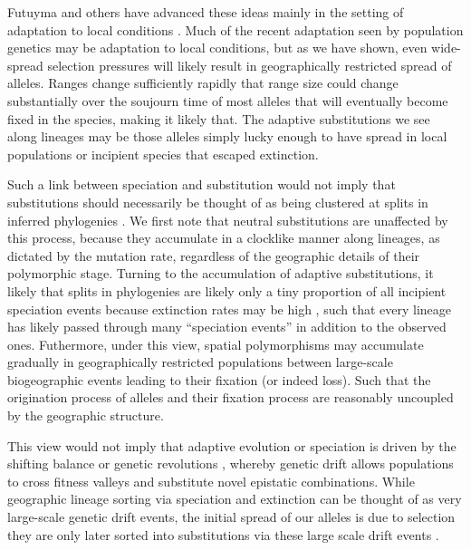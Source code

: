 \documentclass{article}
\begin{document}
Futuyma and others have advanced these ideas mainly in the
setting of adaptation to local conditions 
\citep[particularly local communities ][]{} . 
Much of the recent adaptation seen by
population genetics may be adaptation to local conditions, 
but as we have shown, even wide-spread selection pressures will likely result in 
geographically restricted spread of alleles.
Ranges change sufficiently rapidly that
range size could change substantially over the soujourn time of most alleles 
that will eventually become fixed in the species, making it likely that. 
The adaptive substitutions we see along lineages may be those alleles 
simply lucky enough to have spread in local populations or incipient species that escaped extinction.

Such a link between speciation and substitution would not imply that
substitutions should necessarily be thought of as being clustered at splits in inferred phylogenies 
\citep[see ][for a recent exhange on this]{Pennell:14,Venditti:14,Pennell:14B}. 
We first note that neutral substitutions are unaffected by this process, 
because they accumulate in a clocklike manner along lineages, 
as dictated by the mutation rate, 
regardless of the geographic details of their polymorphic stage. 
Turning to the accumulation of adaptive substitutions, 
it likely that splits in phylogenies are likely only a tiny proportion of all incipient
speciation events because extinction rates may be high
\citep{Rosenblum:12}, such that every lineage has likely passed through
many ``speciation events'' in addition to the observed ones.
Futhermore, under this view, 
spatial polymorphisms may accumulate gradually in geographically restricted populations
between large-scale biogeographic events leading to their fixation (or indeed loss). 
Such that the origination process of alleles and their fixation process
are reasonably uncoupled \citep[in the sense of ][]{Gillespie:94} by the geographic structure.

 
This view would not imply that adaptive evolution or speciation is driven by the
shifting balance or genetic revolutions 
\citep{Wright:32, Mayr-genetic-revol:1954}, 
whereby genetic drift allows
populations to cross fitness valleys and substitute novel epistatic
combinations. While geographic lineage sorting via speciation and
extinction can be thought of as very large-scale genetic drift events,
the initial spread of our alleles is due to selection they are only later sorted 
into substitutions via these large scale drift events \citep[see also
][for discussion]{Futuyma:89}. 
\end{document}
